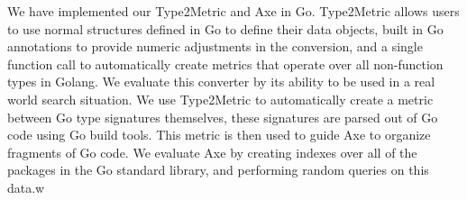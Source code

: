 We have implemented our Type2Metric and Axe in Go.
Type2Metric allows users to use normal structures defined in Go to define their data objects, 
built in Go annotations to provide numeric adjustments in the conversion, 
and a single function call to automatically create metrics that operate over all non-function types in Golang.
We evaluate this converter by its ability to be used in a real world search situation.
We use Type2Metric to automatically create a metric between Go type signatures themselves,
these signatures are parsed out of Go code using Go build tools.
This metric is then used to guide Axe to organize fragments of Go code.
We evaluate Axe by creating indexes over all of the packages in the Go standard library,
and performing random queries on this data.w